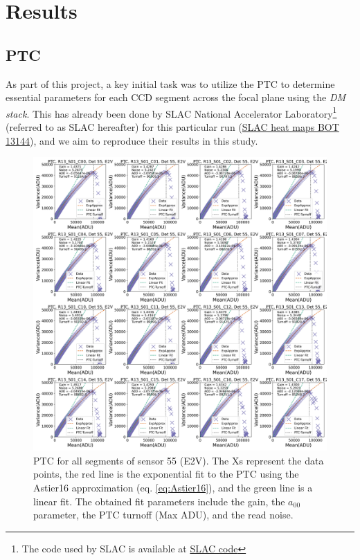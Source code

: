 \section{Results} \label{sec:results}


\subsection{PTC}

As part of this project, a key initial task was to utilize the PTC to determine essential parameters for each CCD segment across the focal plane using the \textit{DM stack}. This has already been done by SLAC National Accelerator Laboratory\footnote{The code used by SLAC is available at \href{https://github.com/lsst-camera-dh/eotest/blob/32c17b0a33b9c099651ed581ee90c1b1101012fb/python/lsst/eotest/sensor/ptcTask.py}{SLAC code}} (referred to as SLAC hereafter) for this particular run (\href{https://srs.slac.stanford.edu/BOT_EO_Reports/13144/}{SLAC heat maps BOT 13144}), and we aim to reproduce their results in this study.

\vspace{3mm}


\begin{figure}[!htb]
    \centering
    \includegraphics[width=\textwidth]{Figures/PTC_Detector55.png}
    \caption{PTC for all segments of sensor 55 (E2V). The Xs represent the data points, the red line is the exponential fit to the PTC using the Astier16 approximation (eq. \ref{eq:Astier16}), and the green line is a linear fit. The obtained fit parameters include the gain, the $a_{00}$ parameter, the PTC turnoff (Max ADU), and the read noise.}
    \label{fig:PTC_55}
\end{figure}

